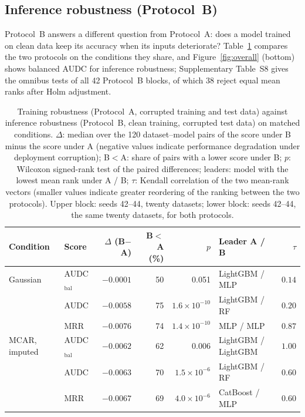 \documentclass[pdflatex,sn-mathphys]{sn-jnl}
\theoremstyle{thmstyleone}
\theoremstyle{thmstyletwo}
\theoremstyle{thmstylethree}
\begin{document}
\subsection{Inference robustness (Protocol~B)}\label{sec:res:deploy}

Protocol~B answers a different question from Protocol~A: does a model trained on clean data keep its accuracy when its inputs deteriorate? Table~\ref{tab:protocol} compares the two protocols on the conditions they share, and Figure~\ref{fig:overall} (bottom) shows balanced AUDC for inference robustness; Supplementary Table~S8 gives the omnibus tests of all 42 Protocol~B blocks, of which 38 reject equal mean ranks after Holm adjustment.

\begin{table}[t]
\centering
\footnotesize
\caption{Training robustness (Protocol~A, corrupted training and test data) against inference robustness (Protocol~B, clean training, corrupted test data) on matched conditions. $\Delta$: median over the 120 dataset--model pairs of the score under B minus the score under A (negative values indicate performance degradation under deployment corruption); B$<$A: share of pairs with a lower score under B; $p$: Wilcoxon signed-rank test of the paired differences; leaders: model with the lowest mean rank under A / B; $\tau$: Kendall correlation of the two mean-rank vectors (smaller values indicate greater reordering of the ranking between the two protocols). Upper block: seeds 42--44, twenty datasets; lower block: seeds 42--44, the same twenty datasets, for both protocols.}
\label{tab:protocol}
\begin{tabular}{@{}llrrrlr@{}}
\toprule
Condition & Score & $\Delta$ (B$-$A) & B$<$A (\%) & $p$ & Leader A / B & $\tau$ \\
\midrule
Gaussian & AUDC$_{\mathrm{bal}}$ & $-0.0001$ & 50 & 0.051 & LightGBM / MLP & $0.14$ \\
 & AUDC & $-0.0058$ & 75 & $1.6\times10^{-10}$ & LightGBM / RF & $0.20$ \\
 & MRR & $-0.0076$ & 74 & $1.4\times10^{-10}$ & MLP / MLP & $0.87$ \\
MCAR, imputed & AUDC$_{\mathrm{bal}}$ & $-0.0062$ & 62 & 0.006 & LightGBM / LightGBM & $1.00$ \\
 & AUDC & $-0.0063$ & 70 & $1.5\times10^{-6}$ & LightGBM / RF & $0.60$ \\
 & MRR & $-0.0067$ & 69 & $4.0\times10^{-6}$ & CatBoost / MLP & $0.60$ \\

\end{tabular}
\end{table}
\end{document}
